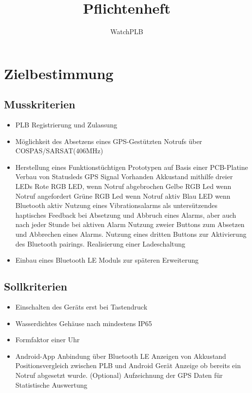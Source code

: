 \documentclass[a4paper]{scrreprt}
\begin{document}
 
\title{Pflichtenheft}
\author{WatchPLB}
\maketitle
 
\begin{abstract}
\end{abstract}
 
\tableofcontents
 
\chapter{Zielbestimmung}
 
\section{Musskriterien}
\begin{itemize}
	\item PLB Registrierung und Zulassung
	\item Möglichkeit des Absetzens eines GPS-Gestützten Notrufs über COSPAS/SARSAT(406MHz)
	\item Herstellung eines Funktionstüchtigen Prototypen auf Basis einer PCB-Platine
	\subitem Verbau von Statusleds
	\subsubitem GPS Signal Vorhanden
	\subsubitem Akkustand mithilfe dreier LEDs
	\subsubitem Rote RGB LED, wenn Notruf abgebrochen
	\subsubitem Gelbe RGB Led wenn Notruf angefordert
	\subsubitem Grüne RGB Led wenn Notruf aktiv
	\subsubitem Blau LED wenn Bluetooth aktiv
	\subitem Nutzung eines Vibrationsalarms als untersützendes haptisches Feedback bei Absetzung und Abbruch eines Alarms, aber auch nach jeder Stunde bei aktiven Alarm
	\subitem Nutzung zweier Buttons zum Absetzen und Abbrechen eines Alarms.
	\subitem Nutzung eines dritten Buttons zur Aktivierung des Bluetooth pairings.
	\subitem Realisierung einer Ladeschaltung
	\item Einbau eines Bluetooth LE Moduls zur späteren Erweiterung
\end{itemize}

 
\section{Sollkriterien}
\begin{itemize}
	\item Einschalten des Geräts erst bei Tastendruck
	\item Wasserdichtes Gehäuse nach mindestens IP65
	\item Formfaktor einer Uhr
	\item Android-App
		\subitem Anbindung über Bluetooth LE
		\subitem Anzeigen von Akkustand
		\subitem Positionsvergleich zwischen PLB und Android Gerät
		\subitem Anzeige ob bereits ein Notruf abgesetzt wurde.
		\subitem (Optional) Aufzeichnung der GPS Daten für Statistische Auswertung
\end{itemize}
 
\end{document}
